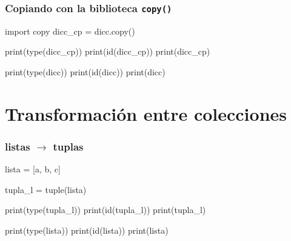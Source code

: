 \documentclass[
  letterpaper,
  DIV=11,
  numbers=noendperiod]{scrreprt}
\newenvironment{Shaded}{\begin{snugshade}}{\end{snugshade}}
\newcommand{\BuiltInTok}[1]{\textcolor[rgb]{0.00,0.23,0.31}{#1}}
\newcommand{\ImportTok}[1]{\textcolor[rgb]{0.00,0.46,0.62}{#1}}
\newcommand{\NormalTok}[1]{\textcolor[rgb]{0.00,0.23,0.31}{#1}}
\newcommand{\OperatorTok}[1]{\textcolor[rgb]{0.37,0.37,0.37}{#1}}
\newcommand{\StringTok}[1]{\textcolor[rgb]{0.13,0.47,0.30}{#1}}
\begin{document}
\subsection{\texorpdfstring{Copiando con la biblioteca
\texttt{copy()}}{Copiando con la biblioteca copy()}}\label{copiando-con-la-biblioteca-copy-2}

\begin{Shaded}
\begin{Highlighting}[]
\ImportTok{import}\NormalTok{ copy}
\NormalTok{dicc\_cp }\OperatorTok{=}\NormalTok{ dicc.copy()}

\BuiltInTok{print}\NormalTok{(}\BuiltInTok{type}\NormalTok{(dicc\_cp))}
\BuiltInTok{print}\NormalTok{(}\BuiltInTok{id}\NormalTok{(dicc\_cp))}
\BuiltInTok{print}\NormalTok{(dicc\_cp)}

\BuiltInTok{print}\NormalTok{(}\BuiltInTok{type}\NormalTok{(dicc))}
\BuiltInTok{print}\NormalTok{(}\BuiltInTok{id}\NormalTok{(dicc))}
\BuiltInTok{print}\NormalTok{(dicc)}
\end{Highlighting}
\end{Shaded}


\chapter{Transformación entre
colecciones}\label{transformaciuxf3n-entre-colecciones}

\subsection{\texorpdfstring{listas \(\to\)
tuplas}{listas \textbackslash to tuplas}}\label{listas-to-tuplas}

\begin{Shaded}
\begin{Highlighting}[]
\NormalTok{lista }\OperatorTok{=}\NormalTok{ [}\StringTok{\textquotesingle{}a\textquotesingle{}}\NormalTok{, }\StringTok{\textquotesingle{}b\textquotesingle{}}\NormalTok{, }\StringTok{\textquotesingle{}c\textquotesingle{}}\NormalTok{]}
\end{Highlighting}
\end{Shaded}

\begin{Shaded}
\begin{Highlighting}[]
\NormalTok{tupla\_l }\OperatorTok{=} \BuiltInTok{tuple}\NormalTok{(lista)}

\BuiltInTok{print}\NormalTok{(}\BuiltInTok{type}\NormalTok{(tupla\_l))}
\BuiltInTok{print}\NormalTok{(}\BuiltInTok{id}\NormalTok{(tupla\_l))}
\BuiltInTok{print}\NormalTok{(tupla\_l)}

\BuiltInTok{print}\NormalTok{(}\BuiltInTok{type}\NormalTok{(lista))}
\BuiltInTok{print}\NormalTok{(}\BuiltInTok{id}\NormalTok{(lista))}
\BuiltInTok{print}\NormalTok{(lista)}
\end{Highlighting}
\end{Shaded}
\end{document}
